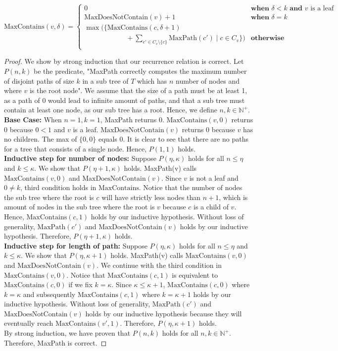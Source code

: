 \documentclass[11pt]{scrartcl}
\newcommand{\maxp}{\text{MaxPath}}
\newcommand{\ctn}{\text{MaxContains}}
\newcommand{\dctn}{\text{MaxDoesNotContain}}
\begin{document}
$$
\ctn(v,\delta) = 
\begin{cases} 
	0 & \textbf{when } \delta < k \textbf{ and } v \text{ is a leaf}\\
	\dctn(v) + 1& \textbf{when } \delta = k\\
	\max\bigg(\Big\{
		\ctn(c,\delta + 1) \\  
		\qquad \qquad \qquad
		+ \displaystyle\sum_{c' \in C_v \setminus \{c\}} \maxp(c') \mid c \in C_v
		\Big\}\bigg)& \textbf{otherwise}\\ 
\end{cases}
$$

\begin{proof}
	We show by strong induction that our recurrence relation is correct. Let $P(n,k)$ be the predicate,
	"MaxPath correctly computes the maximum number of disjoint paths of size $k$ in a sub tree
	of $T$ which has $n$ number of nodes and where $v$ is the root node". 
	We assume that the size of a path must be at least 1, as a path of 0 would lead to infinite amount of 
	paths, and that a sub tree must contain at least one node, as our sub tree has a root. 
	Hence, we define $n,k \in \mathbb{N}^+$. \\
	\textbf{Base Case:} When $n = 1, k = 1$, MaxPath returns 0. $\ctn(v,0)$ returns 0 because 
	$0 < 1$ and $v$ is a leaf. $\dctn(v)$ returns 0 because $v$ has no children. The max of $\{0,0\}$ 
	equals $0$. It is clear to see that there are no paths for a tree that consists of a single node.
	Hence, $P(1,1)$ holds.\\
	\textbf{Inductive step for number of nodes:} Suppose $P(\eta,\kappa)$ holds for all $n \leq \eta$ and $k \leq \kappa$. 
	We show that $P(\eta + 1,\kappa)$ holds. MaxPath(v) calls $\ctn(v,0)$ and $\dctn(v)$. Since $v$
	is not a leaf and $0 \neq k$, third condition holds in $\ctn$. 
	Notice that the number of nodes the sub tree where the root is $c$ will have strictly less nodes than $n + 1$, 
	which is amount of nodes in the sub tree where the root is $v$ because $c$ is a child of $v$.
	Hence, $\ctn(c, 1)$ holds by our inductive hypothesis.
	Without loss of generality, $\maxp(c')$ and $\dctn(v)$ holds by our inductive hypothesis.
	Therefore, $P(\eta + 1,\kappa)$ holds.\\
	\textbf{Inductive step for length of path:} Suppose $P(\eta,\kappa)$ holds for all $n \leq \eta$ and 
	$k \leq \kappa$. We show that $P(\eta,\kappa + 1)$ holds. MaxPath(v) calls $\ctn(v,0)$ and $\dctn(v)$.
	We continue with the third condition in $\ctn(v,0)$. 
	Notice that $\ctn(c, 1)$ is equivalent to $\ctn(c,0)$ if we fix $k = \kappa$.
	Since $\kappa \leq \kappa + 1$, $\ctn(c,0)$ where $k = \kappa$ and subsequently 
	$\ctn(c, 1)$ where $k = \kappa + 1$ holds by our inductive hypothesis. 
	Without loss of generality, $\maxp(c')$ and $\dctn(v)$ holds by our inductive hypothesis
	because they will eventually reach $\ctn(v', 1)$. Therefore, $P(\eta,\kappa+ 1)$ holds.\\
	By strong induction, we have proven that $P(n,k)$ holds for all $n,k \in \mathbb{N}^+$.
	Therefore, MaxPath is correct.
\end{proof}
\end{document}
